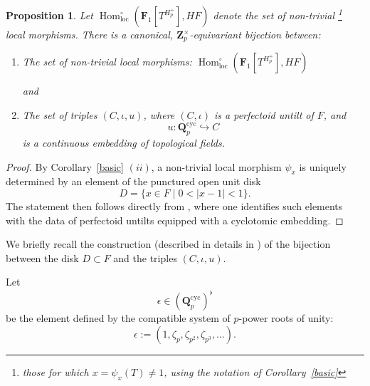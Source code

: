 \documentclass[11pt,a4paper]{article}
\newtheorem{proposition}[theorem]{Proposition}
\newcommand{\Q}{\mathbf{Q}}
\newcommand{\Z}{\mathbf{Z}}
\newcommand{\Fone}{\mathbf{F}_{1}}
\begin{document}
\begin{proposition}\label{lurieprop2}
Let 
$\operatorname{Hom}_{\mathrm{loc}}^\circ
(\Fone[T^{H_p^+}], HF)$ 
denote the set of non-trivial \footnote{those for which 
$x=\psi_x(T)\neq1$, using the notation of Corollary~\ref{basic}} local morphisms. 
There is a canonical, $\Z_p^\times$-equivariant 
bijection between:
\begin{enumerate}
    \item The set of non-trivial local morphisms: 
    $
\operatorname{Hom}_{\mathrm{loc}}^\circ
    (\Fone[T^{H_p^+}], HF)
    $\vspace{.02in}

    and\vspace{.02in}
    
    \item The set of triples $(C,\iota,u)$, where 
    $(C,\iota)$ is a perfectoid untilt of $F$, 
    and 
    \[
    u:\Q_p^{\mathrm{cyc}}\hookrightarrow C
    \]
    is a continuous embedding of topological fields.
\end{enumerate}
\end{proposition}

\begin{proof}
By Corollary~\ref{basic} $(ii)$, a non-trivial local morphism 
$\psi_x$ is uniquely determined by an element 
of the punctured open unit disk
\[
D=\{x\in F\mid 0<|x-1|<1\}.
\]
The statement then follows directly from \cite[Proposition~2 Lecture~8]{Lurie}, 
where one identifies such elements with the data 
of perfectoid untilts equipped with a 
cyclotomic embedding.
\end{proof}


We briefly recall the construction (described in details in \cite{Lurie}) 
of the bijection between the disk $D\subset F$ and the triples 
$(C,\iota,u)$. 

Let 
\[
\epsilon\in(\Q_p^{\mathrm{cyc}})^\flat
\]
be the element defined by the compatible system 
of $p$-power roots of unity:
\[
\epsilon
:=
\left(
1,\zeta_p,\zeta_{p^2},\zeta_{p^3},\ldots
\right).
\]
\end{document}
